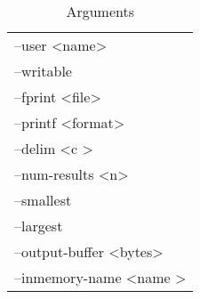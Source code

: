 \begin{table} [h]
\begin{tabular}{l}
    --user \textless name\textgreater\\
    --writable\\
    --fprint \textless file\textgreater\\
    --printf \textless format\textgreater\\
    --delim \textless c \textgreater\\
    --num-results \textless n\textgreater\\
    --smallest\\
    --largest\\
    --output-buffer \textless bytes\textgreater\\
    --inmemory-name \textless name \textgreater
  \end{tabular}
  \caption{\label{fig:gufi_find_arguments} \gufifind Arguments}
\end{table}
